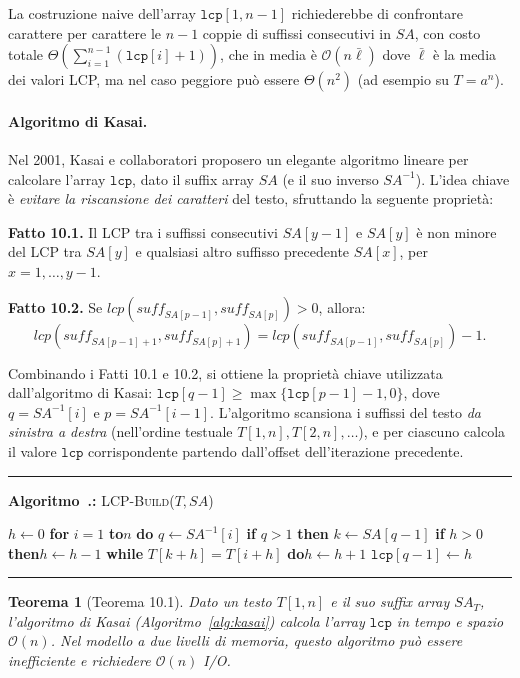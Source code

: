 \documentclass[12pt, a4paper, oneside]{book}
\newcounter{algocf}[chapter]
\renewcommand{\thealgocf}{\thechapter.\arabic{algocf}}
\newenvironment{algorithm}[1][H]{%
  \refstepcounter{algocf}%
  \par\medskip\noindent\rule{\linewidth}{0.4pt}\par\smallskip
}{%
  \par\smallskip\noindent\rule{\linewidth}{0.4pt}\par\medskip
}
\newcommand{\algcaption}[1]{\noindent\textbf{Algoritmo~\thealgocf:} #1\par\smallskip}
\newcommand{\For}[1]{\noindent\textbf{for} #1 \textbf{do}}
\newcommand{\While}[1]{\noindent\textbf{while} #1 \textbf{do}}
\newcommand{\If}[1]{\noindent\textbf{if} #1 \textbf{then}}
\newcommand{\KwTo}{\textbf{to}}
\theoremstyle{plain}
\newtheorem{teorema}{Teorema}[chapter]
\theoremstyle{definition}
\theoremstyle{remark}
\newcommand{\OO}[1]{\mathcal{O}\!\left(#1\right)}
\begin{document}
La costruzione naive dell'array $\mathtt{lcp}[1, n-1]$ richiederebbe di confrontare carattere per carattere le $n-1$ coppie di suffissi consecutivi in $SA$, con costo totale $\Theta\!\left(\sum_{i=1}^{n-1}(\mathtt{lcp}[i]+1)\right)$, che in media è $\OO{n\bar\ell}$ dove $\bar\ell$ è la media dei valori LCP, ma nel caso peggiore può essere $\Theta(n^2)$ (ad esempio su $T = a^n$).

\paragraph{Algoritmo di Kasai.} Nel 2001, Kasai e collaboratori proposero un elegante algoritmo lineare per calcolare l'array $\mathtt{lcp}$, dato il suffix array $SA$ (e il suo inverso $SA^{-1}$). L'idea chiave è \emph{evitare la riscansione dei caratteri} del testo, sfruttando la seguente proprietà:

\begin{mdframed}
\textbf{Fatto 10.1.} Il LCP tra i suffissi consecutivi $SA[y-1]$ e $SA[y]$ è non minore del LCP tra $SA[y]$ e qualsiasi altro suffisso precedente $SA[x]$, per $x = 1, \ldots, y-1$.
\end{mdframed}

\begin{mdframed}
\textbf{Fatto 10.2.} Se $lcp(\mathit{suff}_{SA[p-1]}, \mathit{suff}_{SA[p]}) > 0$, allora:
\[
lcp(\mathit{suff}_{SA[p-1]+1}, \mathit{suff}_{SA[p]+1}) = lcp(\mathit{suff}_{SA[p-1]}, \mathit{suff}_{SA[p]}) - 1.
\]
\end{mdframed}

\noindent Combinando i Fatti 10.1 e 10.2, si ottiene la proprietà chiave utilizzata dall'algoritmo di Kasai: $\mathtt{lcp}[q-1] \geq \max\{\mathtt{lcp}[p-1] - 1, 0\}$, dove $q = SA^{-1}[i]$ e $p = SA^{-1}[i-1]$. L'algoritmo scansiona i suffissi del testo \emph{da sinistra a destra} (nell'ordine testuale $T[1,n], T[2,n], \ldots$), e per ciascuno calcola il valore $\mathtt{lcp}$ corrispondente partendo dall'offset dell'iterazione precedente.

\begin{algorithm}[H]
\algcaption{\textsc{LCP-Build}($T, SA$)}
\label{alg:kasai}
$h \gets 0$\;
\For{$i = 1$ \KwTo $n$}{
  $q \gets SA^{-1}[i]$\;
  \If{$q > 1$}{
    $k \gets SA[q-1]$\;
    \If{$h > 0$}{$h \gets h - 1$\;}
    \While{$T[k+h] = T[i+h]$}{$h \gets h + 1$\;}
    $\mathtt{lcp}[q-1] \gets h$\;
  }
}
\end{algorithm}

\begin{teorema}[Teorema 10.1]
\label{thm:kasai}
Dato un testo $T[1,n]$ e il suo suffix array $SA_T$, l'algoritmo di Kasai (Algoritmo~\ref{alg:kasai}) calcola l'array $\mathtt{lcp}$ in tempo e spazio $\OO{n}$. Nel modello a due livelli di memoria, questo algoritmo può essere inefficiente e richiedere $\OO{n}$ I/O.
\end{teorema}
\end{document}
